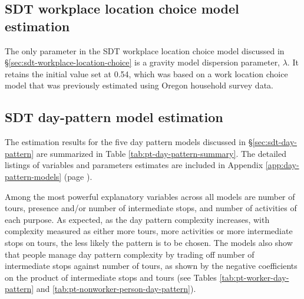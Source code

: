 \subsection{SDT workplace location choice model estimation}
The only parameter in the SDT workplace location choice model discussed in \S\ref{sec:sdt-workplace-location-choice} is a gravity model dispersion parameter, $\lambda$. It retains the initial value set at 0.54, which was based on a work location choice model that was previously estimated using Oregon household survey data.

\subsection{SDT day-pattern model estimation}\label{sec:pt-day-pattern-estimation}
The estimation results for the five day pattern models discussed in \S\ref{sec:sdt-day-pattern} are summarized in Table \ref{tab:pt-day-pattern-summary}. The detailed listings of variables and parameters estimates are included in Appendix \ref{app:day-pattern-models} (page \pageref{app:day-pattern-models}). 

Among the most powerful explanatory variables across all models are number of tours, presence and/or number of intermediate stops, and number of activities of each purpose. As expected, as the day pattern complexity increases, with complexity measured as either more tours, more activities or more intermediate stops on tours, the less likely the pattern is to be chosen. The models also show that people manage day pattern complexity by trading off number of intermediate stops against number of tours, as shown by the negative coefficients on the product of intermediate stops and tours (see Tables \ref{tab:pt-worker-day-pattern} and \ref{tab:pt-nonworker-person-day-pattern}). %

